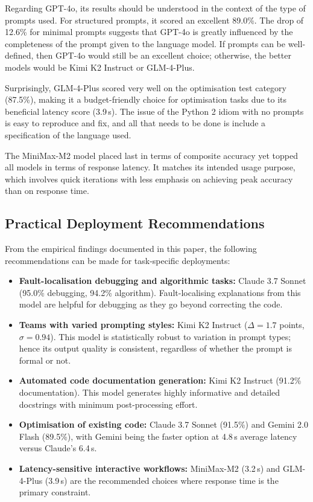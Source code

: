 \documentclass[conference]{IEEEtran}
\begin{document}
Regarding GPT-4o, its results should be understood in the context of the type of prompts used. For structured prompts, it scored an excellent 89.0\%. The drop of 12.6\% for minimal prompts suggests that GPT-4o is greatly influenced by the completeness of the prompt given to the language model. If prompts can be well-defined, then GPT-4o would still be an excellent choice; otherwise, the better models would be Kimi K2 Instruct or GLM-4-Plus.

Surprisingly, GLM-4-Plus scored very well on the optimisation test category (87.5\%), making it a budget-friendly choice for optimisation tasks due to its beneficial latency score (3.9\,s). The issue of the Python 2 idiom with no prompts is easy to reproduce and fix, and all that needs to be done is include a specification of the language used.

The MiniMax-M2 model placed last in terms of composite accuracy yet topped all models in terms of response latency. It matches its intended usage purpose, which involves quick iterations with less emphasis on achieving peak accuracy than on response time.

\subsection{Practical Deployment Recommendations}

From the empirical findings documented in this paper, the following recommendations can be made for task-specific deployments:

\begin{itemize}
  \item \textbf{Fault-localisation debugging and algorithmic tasks:} Claude 3.7 Sonnet (95.0\% debugging, 94.2\% algorithm). Fault-localising explanations from this model are helpful for debugging as they go beyond correcting the code.

  \item \textbf{Teams with varied prompting styles:} Kimi K2 Instruct ($\Delta = 1.7$ points, $\sigma = 0.94$). This model is statistically robust to variation in prompt types; hence its output quality is consistent, regardless of whether the prompt is formal or not.

  \item \textbf{Automated code documentation generation:} Kimi K2 Instruct (91.2\% documentation). This model generates highly informative and detailed docstrings with minimum post-processing effort.

  \item \textbf{Optimisation of existing code:} Claude 3.7 Sonnet (91.5\%) and Gemini 2.0 Flash (89.5\%), with Gemini being the faster option at 4.8\,s average latency versus Claude's 6.4\,s.

  \item \textbf{Latency-sensitive interactive workflows:} MiniMax-M2 (3.2\,s) and GLM-4-Plus (3.9\,s) are the recommended choices where response time is the primary constraint.
\end{itemize}
\end{document}
